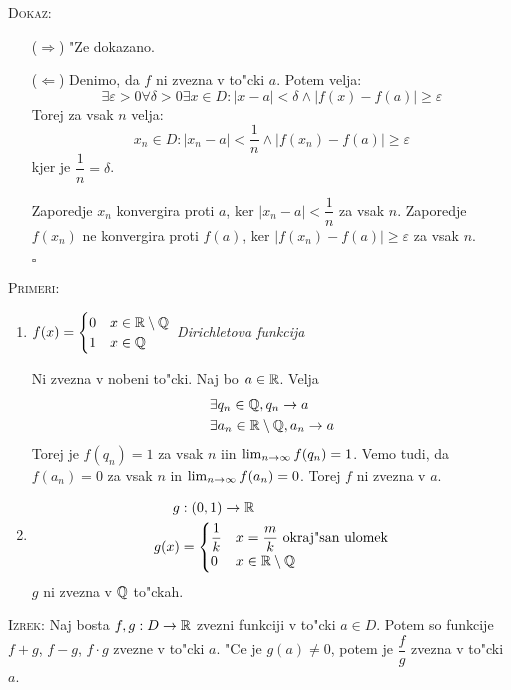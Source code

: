 \textsc{Dokaz:}
\begin{itemize}
	\item[($\Rightarrow$)] "Ze dokazano.
	\item[($\Leftarrow$)] Denimo, da $f$ ni zvezna v to"cki $a$. Potem velja:
	\begin{equation*}
	\exists \varepsilon > 0 \forall \delta > 0 \exists x \in D: |x-a| < \delta \land |f(x) - f(a)| \geq \varepsilon
	\end{equation*}
	Torej za vsak $n$ velja:
	\begin{equation*}
	x_n \in D: |x_n - a| < \dfrac{1}{n} \land |f(x_n) - f(a)| \geq \varepsilon
	\end{equation*}
	kjer je $\dfrac{1}{n} = \delta$.
	
	Zaporedje $x_n$ konvergira proti $a$, ker $|x_n - a| < \dfrac{1}{n}$ za vsak $n$. Zaporedje $f(x_n)$ ne konvergira proti $f(a)$, ker $|f(x_n) - f(a)| \geq \varepsilon$ za vsak $n$. 
	
	\hfill $\square$
\end{itemize}
\textsc{Primeri:}
\begin{enumerate}[1)]
	\item $f(x) = \begin{cases}0 & x \in \mathbb{R} \setminus \mathbb{Q} \\
	1 & x \in \mathbb{Q}
	\end{cases}$ \quad \emph{Dirichletova funkcija}
	
	Ni zvezna v nobeni to"cki. Naj bo $a \in \mathbb{R}$. Velja
	\begin{align*}
	\exists &q_n \in \mathbb{Q}, q_n \to a \\
	\exists &a_n \in \mathbb{R} \setminus \mathbb{Q}, a_n \to a
	\end{align*}
	Torej je $f(q_n) = 1$ za vsak $n$ iin $\lim_{n \rightarrow \infty} f(q_n) = 1$. Vemo tudi, da $f(a_n) = 0$ za vsak $n$ in $\lim_{n \rightarrow \infty} f(a_n) = 0$. Torej $f$ ni zvezna v $a$.
	
	\item \begin{align*}
	g&: (0, 1) \to \mathbb{R} \\
	g(x) &= \begin{cases}
	\dfrac{1}{k} & x = \dfrac{m}{k} \text{ okraj"san ulomek}\\
	0 & x \in \mathbb{R} \setminus \mathbb{Q}
	\end{cases}
	\end{align*}
	$g$ ni zvezna v $\mathbb{Q}$ to"ckah.
\end{enumerate}
%
\textsc{Izrek:} Naj bosta $f, g: D \to \mathbb{R}$ zvezni funkciji v to"cki $a \in D$. Potem so funkcije $f + g$, $f-g$, $f\cdot g$ zvezne v to"cki $a$. "Ce je $g(a) \neq 0$, potem je $\dfrac{f}{g}$ zvezna v to"cki $a$.

